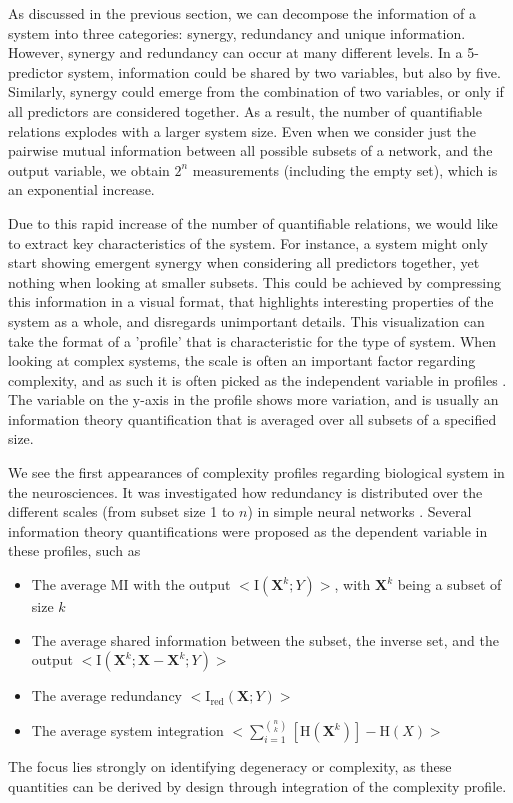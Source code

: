 \documentclass[../main.tex]{subfiles}
\begin{document}
As discussed in the previous section, we can decompose the information of a system into three categories: synergy, redundancy and unique information.
However, synergy and redundancy can occur at many different levels.
In a 5-predictor system, information could be shared by two variables, but also by five.
Similarly, synergy could emerge from the combination of two variables, or only if all predictors are considered together.
As a result, the number of quantifiable relations explodes with a larger system size.
Even when we consider just the pairwise mutual information between all possible subsets of a network, and the output variable, we obtain $2^n$ measurements (including the empty set), which is an exponential increase.

Due to this rapid increase of the number of quantifiable relations, we would like to extract key characteristics of the system.
For instance, a system might only start showing emergent synergy when considering all predictors together, yet nothing when looking at smaller subsets.
This could be achieved by compressing this information in a visual format, that highlights interesting properties of the system as a whole, and disregards unimportant details.
This visualization can take the format of a 'profile' that is characteristic for the type of system.
When looking at complex systems, the scale is often an important factor regarding complexity, and as such it is often picked as the independent variable in profiles \cite{bar2013computationally, quax2017quantifying, tononi1999measures}.
The variable on the y-axis in the profile shows more variation, and is usually an information theory quantification that is averaged over all subsets of a specified size.

We see the first appearances of complexity profiles regarding biological system in the neurosciences.
It was investigated how redundancy is distributed over the different scales (from subset size 1 to $n$) in simple neural networks \cite{tononi1999measures}.
Several information theory quantifications were proposed as the dependent variable in these profiles, such as
%
\begin{itemize}
\item The average MI with the output $<\mathrm{I}\left( \mathbf{X}^k;Y \right) >$, with $\mathbf{X}^k$ being a subset of size $k$
\item The average shared information between the subset, the inverse set, and the output  $<\mathrm{I}\left( \mathbf{X}^k;\mathbf{X} - \mathbf{X}^k;Y\right) >$
\item The average redundancy $<\mathrm{I}_\mathrm{red}\left( \mathbf{X};Y\right) >$
\item The average system integration $<\sum_{i = 1}^{\binom{n}{k}}[\mathrm{H}(\mathbf{X}^k)] - \mathrm{H}\left( X\right) >$
\end{itemize}
%
The focus lies strongly on identifying degeneracy or complexity, as these quantities can be derived by design through integration of the complexity profile.
\end{document}
